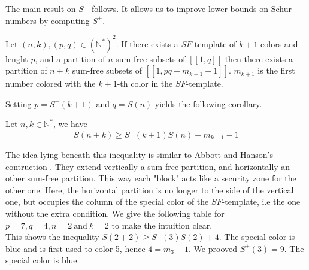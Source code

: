 The main result on \(S^+\) follows. It allows us to improve lower bounds on Schur numbers by computing \(S^+\).

\begin{theorem}
	Let \((n,k), (p,q) \in (\mathbb{N}^*)^2\). If there exists a \(SF\)-template of \(k+1\) colors and lenght \(p\),
and a partition of \(n\) sum-free subsets of \([\![1,q]\!]\) then there exists a partition of \(n+k\) sum-free subsets
of \([\![1,pq+m_{k+1}-1]\!]\). \(m_{k+1}\) is the first number colored with the \(k+1\)-th color in the \(SF\)-template.
\end{theorem}

Setting \(p = S^+(k+1)\) and \(q = S(n)\) yields the following corollary.

\begin{corollary}
	Let \(n, k \in \mathbb{N}^*\), we have \\
	\[ S(n+k) \geqslant S^+(k+1)S(n) + m_{k+1} - 1 \]
\end{corollary}

The idea lying beneath this inequality is similar to Abbott and Hanson's contruction \cite{AbbottHanson}. 
They extend vertically a sum-free partition, and horizontally an other sum-free partition. This way each "block" 
acts like a security zone for the other one. Here, the horizontal partition is no longer to the side of the 
vertical one, but occupies the column of the special color of the \(SF\)-template, i.e the one without the 
extra condition. We give the following table for \(p = 7, q = 4, n = 2 ~\textrm{and}~ k = 2\) to make the intuition clear. \\

This shows the inequality \(S(2+2) \geqslant S^+(3)S(2) + 4\). The special color is blue and is first used
to color 5, hence \(4 = m_{3} - 1\). 
We prooved \(S^+(3) = 9\). The special color is blue. 

